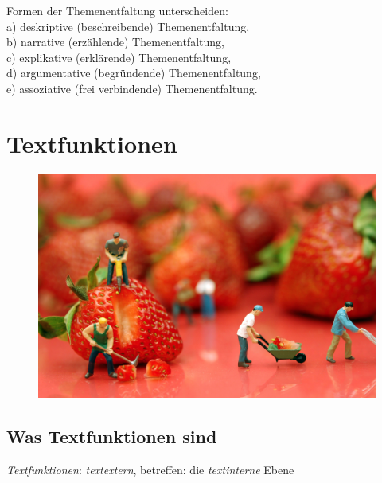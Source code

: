 \documentclass[
  letterpaper,
]{scrbook}
\begin{document}
Formen der Themenentfaltung unterscheiden:\\
a) deskriptive (beschreibende) Themenentfaltung,\\
b) narrative (erzählende) Themenentfaltung,\\
c) explikative (erklärende) Themenentfaltung,\\
d) argumentative (begründende) Themenentfaltung,\\
e) assoziative (frei verbindende) Themenentfaltung.\\

\hypertarget{textfunktionen}{%
\chapter{Textfunktionen}\label{textfunktionen}}

\begin{figure}

{\centering 

\href{https://www.zukunftsinstitut.de/artikel/fuenf-thesen-zur-zukunft-der-arbeit/}{\includegraphics[width=1\textwidth,height=\textheight]{./pictures/04_flickr_JH_Hancock_cc__by.jpg}}

}

\end{figure}

\hypertarget{was-textfunktionen-sind}{%
\section{Was Textfunktionen sind}\label{was-textfunktionen-sind}}

\emph{Textfunktionen}: \emph{textextern}, betreffen: die
\emph{textinterne} Ebene
\end{document}
